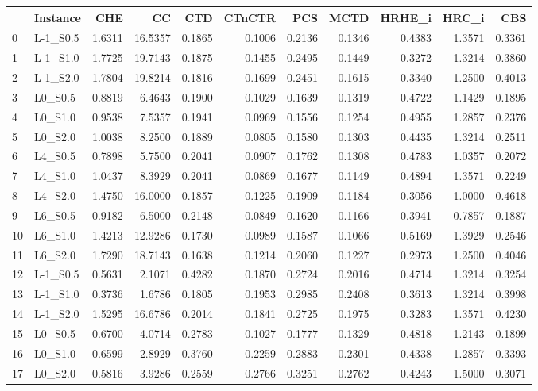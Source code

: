 \begin{tabular}{llrrrrrrrrr}
\toprule
 & Instance & CHE & CC & CTD & CTnCTR & PCS & MCTD & HRHE_i & HRC_i & CBS \\
\midrule
0 & L-1_S0.5 & 1.6311 & 16.5357 & 0.1865 & 0.1006 & 0.2136 & 0.1346 & 0.4383 & 1.3571 & 0.3361 \\
1 & L-1_S1.0 & 1.7725 & 19.7143 & 0.1875 & 0.1455 & 0.2495 & 0.1449 & 0.3272 & 1.3214 & 0.3860 \\
2 & L-1_S2.0 & 1.7804 & 19.8214 & 0.1816 & 0.1699 & 0.2451 & 0.1615 & 0.3340 & 1.2500 & 0.4013 \\
3 & L0_S0.5 & 0.8819 & 6.4643 & 0.1900 & 0.1029 & 0.1639 & 0.1319 & 0.4722 & 1.1429 & 0.1895 \\
4 & L0_S1.0 & 0.9538 & 7.5357 & 0.1941 & 0.0969 & 0.1556 & 0.1254 & 0.4955 & 1.2857 & 0.2376 \\
5 & L0_S2.0 & 1.0038 & 8.2500 & 0.1889 & 0.0805 & 0.1580 & 0.1303 & 0.4435 & 1.3214 & 0.2511 \\
6 & L4_S0.5 & 0.7898 & 5.7500 & 0.2041 & 0.0907 & 0.1762 & 0.1308 & 0.4783 & 1.0357 & 0.2072 \\
7 & L4_S1.0 & 1.0437 & 8.3929 & 0.2041 & 0.0869 & 0.1677 & 0.1149 & 0.4894 & 1.3571 & 0.2249 \\
8 & L4_S2.0 & 1.4750 & 16.0000 & 0.1857 & 0.1225 & 0.1909 & 0.1184 & 0.3056 & 1.0000 & 0.4618 \\
9 & L6_S0.5 & 0.9182 & 6.5000 & 0.2148 & 0.0849 & 0.1620 & 0.1166 & 0.3941 & 0.7857 & 0.1887 \\
10 & L6_S1.0 & 1.4213 & 12.9286 & 0.1730 & 0.0989 & 0.1587 & 0.1066 & 0.5169 & 1.3929 & 0.2546 \\
11 & L6_S2.0 & 1.7290 & 18.7143 & 0.1638 & 0.1214 & 0.2060 & 0.1227 & 0.2973 & 1.2500 & 0.4046 \\
12 & L-1_S0.5 & 0.5631 & 2.1071 & 0.4282 & 0.1870 & 0.2724 & 0.2016 & 0.4714 & 1.3214 & 0.3254 \\
13 & L-1_S1.0 & 0.3736 & 1.6786 & 0.1805 & 0.1953 & 0.2985 & 0.2408 & 0.3613 & 1.3214 & 0.3998 \\
14 & L-1_S2.0 & 1.5295 & 16.6786 & 0.2014 & 0.1841 & 0.2725 & 0.1975 & 0.3283 & 1.3571 & 0.4230 \\
15 & L0_S0.5 & 0.6700 & 4.0714 & 0.2783 & 0.1027 & 0.1777 & 0.1329 & 0.4818 & 1.2143 & 0.1899 \\
16 & L0_S1.0 & 0.6599 & 2.8929 & 0.3760 & 0.2259 & 0.2883 & 0.2301 & 0.4338 & 1.2857 & 0.3393 \\
17 & L0_S2.0 & 0.5816 & 3.9286 & 0.2559 & 0.2766 & 0.3251 & 0.2762 & 0.4243 & 1.5000 & 0.3071 \\

\end{tabular}
